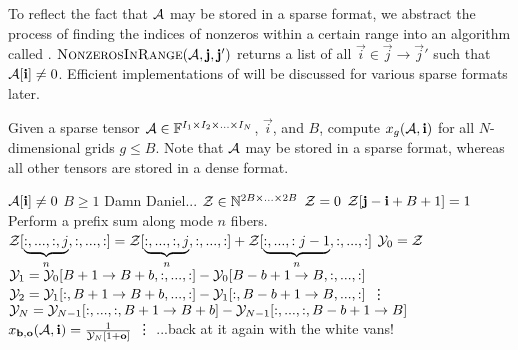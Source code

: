     To reflect the fact that $\mathbf{\mathcal{A}}$ may be stored in a sparse format, we abstract the process of finding the indices of nonzeros within a certain range into an algorithm called . $\textproc{NonzerosInRange}(\Ten{A}, \vec{j}, \vec{j}')$ returns a list of all $\vec{i} \in \vec{j} \to \vec{j}'$ such that $\mathbf{\mathcal{A}}[\mathbf{i}] \neq 0$. Efficient implementations of  will be discussed for various sparse formats later.

    \begin{samepage}
    \begin{alg}
      Given a sparse tensor $\mathbf{\mathcal{A}} \in \mathbb{F}^{I_1 \times I_2 \times ... \times I_N}$, $\vec{i}$, and $B$, compute $x_g(\mathbf{\mathcal{A}}, \mathbf{i})$ for all $N$-dimensional grids $g \leq B$. Note that $\mathbf{\mathcal{A}}$ may be stored in a sparse format, whereas all other tensors are stored in a dense format.
      \begin{algorithmic}[1]
        \Require
        \Statex $\mathbf{\mathcal{A}}[\mathbf{i}] \neq 0$
        \Statex $B \geq 1$
        \Statex Damn Daniel...
          \State $\mathbf{\mathcal{Z}} \in \mathbb{N}^{2B \times ... \times 2B}$
          \State $\mathbf{\mathcal{Z}} = 0$
           \label{alg:depositrestricted:loop}
            \State $\mathbf{\mathcal{Z}}[\mathbf{j} - \mathbf{i} + B + 1] = 1$
          \EndFor
              \Comment Perform a prefix sum along mode $n$ fibers.
              \State $\mathbf{\mathcal{Z}}[\underbrace{:,...,:,j}_{n}, :, ..., :] = \mathbf{\mathcal{Z}}[\underbrace{:,...,:,j}_{n}, :, ..., :] + \mathbf{\mathcal{Z}}[\underbrace{:,...,:j - 1}_{n}, :, ..., :]$
            \EndFor
          \EndFor
          \State $\mathbf{\mathcal{Y}}_0 = \mathbf{\mathcal{Z}}$
            \State $\mathbf{\mathcal{Y}}_1 = \mathbf{\mathcal{Y}}_0[B + 1 \to B + b, :, ..., :] - \mathbf{\mathcal{Y}}_0[B - b + 1 \to B, :, ..., :]$
              \State $\mathbf{\mathcal{Y}}_2 = \mathbf{\mathcal{Y}}_1[:, B + 1 \to B + b, ..., :] - \mathbf{\mathcal{Y}}_1[:, B - b + 1 \to B, ..., :]$
              \Statex \vdots\nopagebreak
                \State $\mathbf{\mathcal{Y}}_N = \mathbf{\mathcal{Y}}_{N - 1}[:, ..., :, B + 1 \to B + b] - \mathbf{\mathcal{Y}}_{N - 1}[:, ..., :, B - b + 1 \to B]$
                  \State $x_{\mathbf{b}, \mathbf{o}}(\mathbf{\mathcal{A}}, \mathbf{i}) = \frac{1}{\mathbf{\mathcal{Y}}_N[1 + \mathbf{o}]}$
                \EndFor
              \EndFor
              \Statex \vdots\nopagebreak
            \EndFor
          \EndFor
        \EndFunction
        \Ensure
        \Statex ...back at it again with the white vans!
      \end{algorithmic}
      \label{alg:sample}
    \end{alg}
    \end{samepage}
